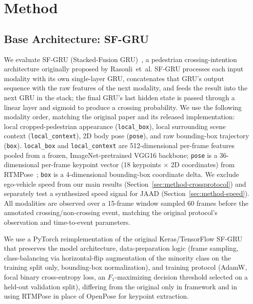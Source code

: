 
\section{Method}
\label{sec:method}

\subsection{Base Architecture: SF-GRU}
\label{sec:method-sfgru}

We evaluate SF-GRU (Stacked-Fusion GRU)~\cite{rasouli2020sfgru}, a
pedestrian crossing-intention architecture originally proposed by
Rasouli~et~al. SF-GRU processes each input modality with its own
single-layer GRU, concatenates that GRU's output sequence with the raw
features of the next modality, and feeds the result into the next GRU in
the stack; the final GRU's last hidden state is passed through a linear
layer and sigmoid to produce a crossing probability. We use the
following modality order, matching the original paper and its released
implementation: local cropped-pedestrian appearance
(\texttt{local\_box}), local surrounding scene context
(\texttt{local\_context}), 2D body pose (\texttt{pose}), and raw
bounding-box trajectory (\texttt{box}). \texttt{local\_box} and
\texttt{local\_context} are 512-dimensional per-frame features pooled
from a frozen, ImageNet-pretrained VGG16 backbone; \texttt{pose} is a
36-dimensional per-frame keypoint vector (18 keypoints $\times$ 2D
coordinates) from RTMPose~\cite{rtmpose}; \texttt{box} is a 4-dimensional
bounding-box coordinate delta. We exclude ego-vehicle speed from our
main results (Section~\ref{sec:method-crossprotocol}) and separately
test a synthesized speed signal for JAAD
(Section~\ref{sec:method-speed}). All modalities are observed over a
15-frame window sampled 60 frames before the annotated crossing/non-crossing
event, matching the original protocol's observation and
time-to-event parameters.

We use a PyTorch reimplementation of the original Keras/TensorFlow SF-GRU
that preserves the model architecture, data-preparation logic (frame
sampling, class-balancing via horizontal-flip augmentation of the
minority class on the training split only, bounding-box normalization),
and training protocol (AdamW, focal binary cross-entropy loss, an
$F_1$-maximizing decision threshold selected on a held-out validation
split), differing from the original only in framework and in using
RTMPose in place of OpenPose for keypoint extraction.

